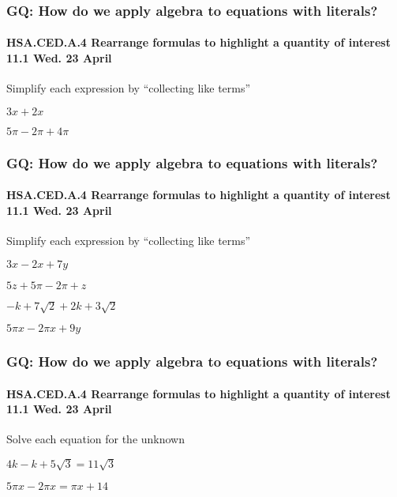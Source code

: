 \documentclass{beamer}
\begin{document}
\frame
{
  \frametitle{GQ: How do we apply algebra to equations with literals?}
  \framesubtitle{HSA.CED.A.4 Rearrange formulas to highlight a quantity of interest \hfill \alert{11.1 Wed. 23 April}}
  
  \Large{
  Simplify each expression by ``collecting like terms''
  
  \begin{enumerate}
    \begin{multicols}{2}
      \item $3x+2x$ \vspace{2cm}
      \item $5\pi-2\pi+4\pi$
    \end{multicols}
    \end{enumerate} \vspace{5cm}
}
}

\frame
{
  \frametitle{GQ: How do we apply algebra to equations with literals?}
  \framesubtitle{HSA.CED.A.4 Rearrange formulas to highlight a quantity of interest \hfill \alert{11.1 Wed. 23 April}}

  Simplify each expression by ``collecting like terms''
  
  \begin{enumerate}%
    \begin{multicols}{2}
      \item $3x-2x+7y$ \vspace{2cm}
      \item $5z+5\pi-2\pi+z$
      \item $-k+7\sqrt{2}+2k+3\sqrt{2}$ \vspace{2cm}
      \item $5\pi x-2 \pi x +9y$
    \end{multicols}
    \end{enumerate} \vspace{2cm}
}

\frame
{
  \frametitle{GQ: How do we apply algebra to equations with literals?}
  \framesubtitle{HSA.CED.A.4 Rearrange formulas to highlight a quantity of interest \hfill \alert{11.1 Wed. 23 April}}

  Solve each equation for the unknown
  
  \begin{enumerate}%
    \begin{multicols}{2}
      \item $4k-k+5\sqrt{3}=11\sqrt{3}$
      \item $5\pi x-2 \pi x= \pi x +14$
    \end{multicols}
    \end{enumerate} \vspace{7cm}
}
\end{document}
